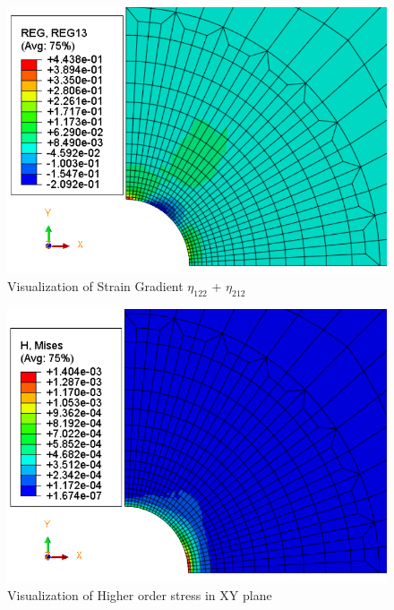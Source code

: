 \documentclass[12pt]{article}
\begin{document}
\begin{figure}[H]
	\begin{center}
		\includegraphics[scale=0.8]{Reg13_crop.png} 
	\end{center}  
   \caption{Visualization of Strain Gradient $\eta_{122}$ + $\eta_{212}$}
\end{figure}
\begin{figure}[H]
	\begin{center}
		\includegraphics[scale=0.8]{Higher_order_stress_crop.png} 
	\end{center}  
	\caption{Visualization of Higher order stress in XY plane}
\end{figure}
\end{document}
